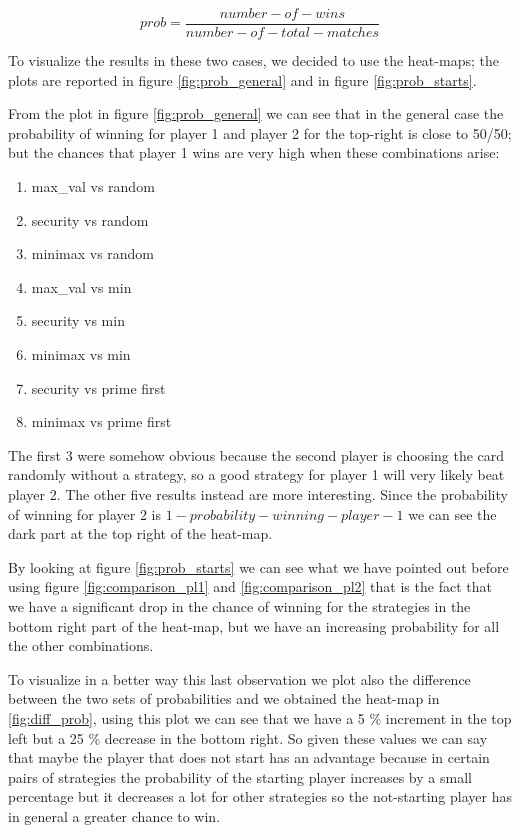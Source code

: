 \begin{equation} \label{eq:probability_cal}
    prob = \frac{number-of-wins}{number-of-total-matches}
\end{equation}

To visualize the results in these two cases, we decided to use the heat-maps; the plots are reported in figure \ref{fig:prob_general} and in figure \ref{fig:prob_starts}. 

From the plot in figure \ref{fig:prob_general} we can see that in the general case the probability of winning for player 1 and player 2 for the top-right is close to 50/50; but the chances that player 1 wins are very high when these combinations arise:
\begin{enumerate}
    \item max\_val vs random
    \item security vs random
    \item minimax vs random
    \item max\_val vs min
    \item security vs min
    \item minimax vs min
    \item security vs prime first
    \item minimax vs prime first
\end{enumerate}
The first 3 were somehow obvious because the second player is choosing the card randomly without a strategy, so a good strategy for player 1 will very likely beat player 2. The other five results instead are more interesting. 
Since the probability of winning for player 2 is $1 - probability-winning-player-1$ we can see the dark part at the top right of the heat-map.

By looking at figure \ref{fig:prob_starts} we can see what we have pointed out before using figure \ref{fig:comparison_pl1} and \ref{fig:comparison_pl2} that is the fact that we have a significant drop in the chance of winning for the strategies in the bottom right part of the heat-map, but we have an increasing probability for all the other combinations.

To visualize in a better way this last observation we plot also the difference between the two sets of probabilities and we obtained the heat-map in \ref{fig:diff_prob}, using this plot we can see that we have a 5 \% increment in the top left but a 25 \% decrease in the bottom right. So given these values we can say that maybe the player that does not start has an advantage because in certain pairs of strategies the probability of the starting player increases by a small percentage but it decreases a lot for other strategies so the not-starting player has in general a greater chance to win.

